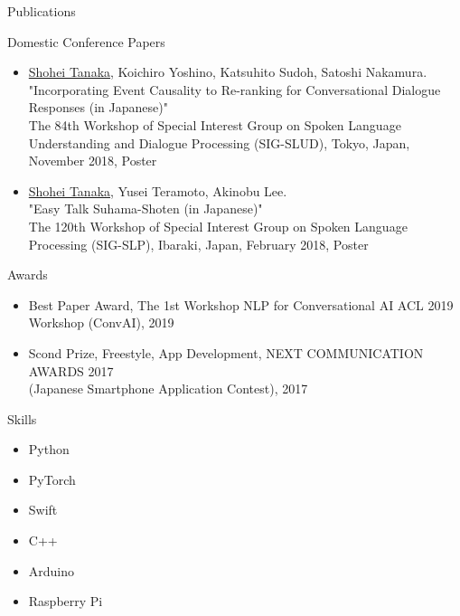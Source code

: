 \documentclass{resume} %
\begin{document}
\begin{rSection}{Publications}
\begin{rSubsection}{Domestic Conference Papers}{}{}{}
\begin{itemize}
\item \underline{Shohei Tanaka}, Koichiro Yoshino, Katsuhito Sudoh, Satoshi Nakamura.
\\"Incorporating Event Causality to Re-ranking for Conversational Dialogue Responses (in Japanese)"
\\The 84th Workshop of Special Interest Group on Spoken Language Understanding and Dialogue Processing (SIG-SLUD), Tokyo, Japan, November 2018, Poster

\item \underline{Shohei Tanaka}, Yusei Teramoto, Akinobu Lee.
\\"Easy Talk Suhama-Shoten (in Japanese)"
\\The 120th Workshop of Special Interest Group on Spoken Language Processing (SIG-SLP), Ibaraki, Japan, February 2018, Poster
\end{itemize}
\end{rSubsection}

\end{rSection}


\begin{rSection}{Awards}

\begin{itemize}
    \item Best Paper Award, The 1st Workshop NLP for Conversational AI ACL 2019 Workshop (ConvAI), 2019
    \item Scond Prize, Freestyle, App Development, NEXT COMMUNICATION AWARDS 2017
    \\(Japanese Smartphone Application Contest), 2017
\end{itemize}

\end{rSection}


\begin{rSection}{Skills}

\begin{multicols}{3}
\begin{itemize}
    \item Python
    \item PyTorch
    \item Swift
    \item C++
    \item Arduino
    \item Raspberry Pi
\end{itemize}
\end{multicols}

\end{rSection}
\end{document}

